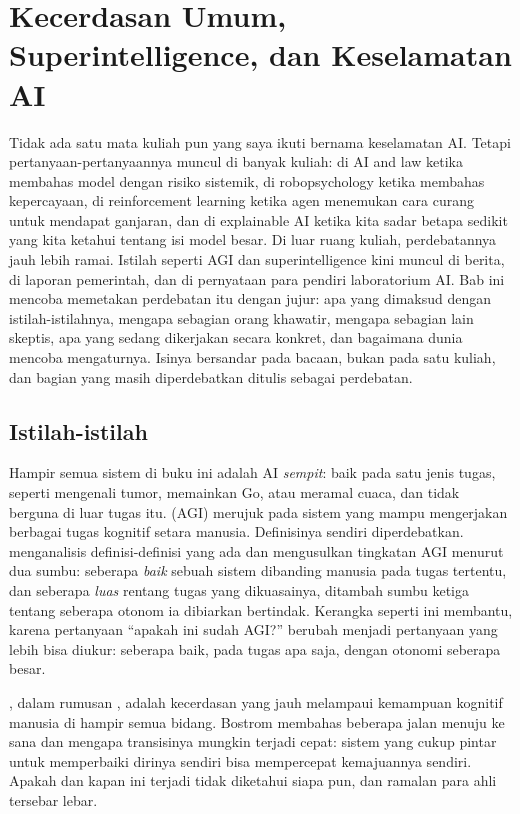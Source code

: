 \chapter{Kecerdasan Umum, Superintelligence, dan Keselamatan AI}
\label{ch:keselamatan}

Tidak ada satu mata kuliah pun yang saya ikuti bernama keselamatan AI. Tetapi pertanyaan-pertanyaannya muncul di banyak kuliah:
di AI and law ketika membahas model dengan risiko sistemik, di robopsychology ketika membahas kepercayaan, di reinforcement
learning ketika agen menemukan cara curang untuk mendapat ganjaran, dan di explainable AI ketika kita sadar betapa sedikit yang kita
ketahui tentang isi model besar. Di luar ruang kuliah, perdebatannya jauh lebih ramai. Istilah seperti AGI dan superintelligence
kini muncul di berita, di laporan pemerintah, dan di pernyataan para pendiri laboratorium AI. Bab ini mencoba memetakan perdebatan
itu dengan jujur: apa yang dimaksud dengan istilah-istilahnya, mengapa sebagian orang khawatir, mengapa sebagian lain
skeptis, apa yang sedang dikerjakan secara konkret, dan bagaimana dunia mencoba mengaturnya. Isinya bersandar pada bacaan, bukan
pada satu kuliah, dan bagian yang masih diperdebatkan ditulis sebagai perdebatan.

\section{Istilah-istilah}

Hampir semua sistem di buku ini adalah AI \emph{sempit}: baik pada satu jenis tugas, seperti mengenali tumor, memainkan Go,
atau meramal cuaca, dan tidak berguna di luar tugas itu.  (AGI) merujuk pada sistem yang
mampu mengerjakan berbagai tugas kognitif setara manusia. Definisinya sendiri diperdebatkan. \citet{morris2023} menganalisis
definisi-definisi yang ada dan mengusulkan tingkatan AGI menurut dua sumbu: seberapa \emph{baik} sebuah sistem dibanding manusia
pada tugas tertentu, dan seberapa \emph{luas} rentang tugas yang dikuasainya, ditambah sumbu ketiga tentang seberapa otonom ia
dibiarkan bertindak. Kerangka seperti ini membantu, karena pertanyaan ``apakah ini sudah AGI?'' berubah menjadi pertanyaan yang lebih
bisa diukur: seberapa baik, pada tugas apa saja, dengan otonomi seberapa besar.

, dalam rumusan \citet{bostrom2014}, adalah kecerdasan yang jauh melampaui kemampuan kognitif manusia di
hampir semua bidang. Bostrom membahas beberapa jalan menuju ke sana dan mengapa transisinya mungkin terjadi cepat: sistem yang cukup
pintar untuk memperbaiki dirinya sendiri bisa mempercepat kemajuannya sendiri. Apakah dan kapan ini terjadi tidak diketahui siapa
pun, dan ramalan para ahli tersebar lebar.

